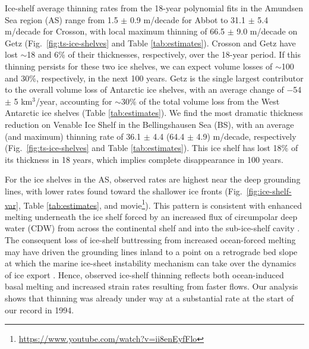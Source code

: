 Ice-shelf average thinning rates from the 18-year polynomial fits in the
Amundsen Sea region (AS) range from 1.5 $\pm$ 0.9 m/decade for Abbot to 
31.1 $\pm$ 5.4 m/decade for Crosson, with local maximum thinning of 
66.5 $\pm$ 9.0 m/decade on Getz (Fig.~\ref{fig:ts-ice-shelves} and Table
\ref{tab:estimates}). Crosson and Getz have lost $\sim$18 and 6\% of their
thicknesses, respectively, over the 18-year period. If this thinning persists
for these two ice shelves, we can expect volume losses of $\sim$100 and 30\%,
respectively, in the next 100 years. Getz is the single largest contributor to
the overall volume loss of Antarctic ice shelves, with an average change of 
$-$54 $\pm$ 5 km$^3$/year, accounting for $\sim$30\% of the total volume loss
from the West Antarctic ice shelves (Table \ref{tab:estimates}). We find the most
dramatic thickness reduction on Venable Ice Shelf in the Bellingshausen Sea
(BS), with an average (and maximum) thinning rate of 36.1 $\pm$ 4.4
(64.4 $\pm$ 4.9) m/decade, respectively (Fig.~\ref{fig:ts-ice-shelves} and Table
\ref{tab:estimates}). This ice shelf has lost 18\% of its thickness in 18 years,
which implies complete disappearance in 100 years.

For the ice shelves in the AS, observed rates
are highest near the deep grounding lines, with
lower rates found toward the shallower ice fronts
(Fig.~\ref{fig:ice-shelf-var}, Table \ref{tab:estimates}, and movie\footnote{\url{https://www.youtube.com/watch?v=ii8enEyfFlo}}). This pattern is
consistent with enhanced melting underneath
the ice shelf forced by an increased flux of circumpolar
deep water (CDW) from across the continental
shelf and into the sub-ice-shelf cavity
\parencite{Dutrieux2014, Jacobs2011, Thoma2008}. The consequent loss of ice-shelf buttressing
from increased ocean-forced melting may
have driven the grounding lines inland \parencite{Rignot2014} to
a point on a retrograde bed slope at which the
marine ice-sheet instability mechanism can take
over the dynamics of ice export \parencite{Schoof2007, Weertman1974}. Hence,
observed ice-shelf thinning reflects both ocean-induced
basal melting and increased strain rates
resulting from faster flows. Our analysis shows
that thinning was already under way at a substantial
rate at the start of our record in 1994.


